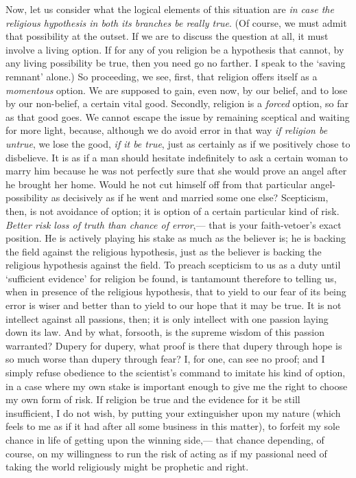 \documentclass[12pt]{article}
\begin{document}
Now, let us consider what the logical elements of this situation are \emph{in case the religious hypothesis in both its branches be really true}. (Of course, we must admit that possibility at the outset.  If we are to discuss the question at all, it must involve a living option.  If for any of you religion be a hypothesis that cannot, by any living possibility be true, then you need go no farther.  I speak to the `saving remnant' alone.)  So proceeding, we see, first, that religion offers itself as a \emph{momentous} option.  We are supposed to gain, even now, by our belief, and to lose by our non-belief, a certain vital good.  Secondly, religion is a \emph{forced} option, so far as that good goes.  We cannot escape the issue by remaining sceptical and waiting for more light, because, although we do avoid error in that way \emph{if religion be untrue}, we lose the good, \emph{if it be true}, just as certainly as if we positively chose to disbelieve.  It is as if a man should hesitate indefinitely to ask a certain woman to marry him because he was not perfectly sure that she would prove an angel after he brought her home.  Would he not cut himself off from that particular angel-possibility as decisively as if he went and married some one else?  Scepticism, then, is not avoidance of option; it is option of a certain particular kind of risk.  \emph{Better risk loss of truth than chance of error},--- that is your faith-vetoer's exact position.  He is actively playing his stake as much as the believer is; he is backing the field against the religious hypothesis, just as the believer is backing the religious hypothesis against the field.  To preach scepticism to us as a duty until  `sufficient evidence' for religion be found, is tantamount therefore to telling us, when in presence of the religious hypothesis, that to yield to our fear of its being error is wiser and better than to yield to our hope that it may be true.  It is not intellect against all passions, then; it is only intellect with one passion laying down its law.  And by what, forsooth, is the supreme wisdom of this passion warranted?  Dupery for dupery, what proof is there that dupery through hope is so much worse than dupery through fear?  I, for one, can see no proof; and I simply refuse obedience to the scientist's command to imitate his kind of option, in a case where my own stake is important enough to give me the right to choose my own form of risk.  If religion be true and the evidence for it be still insufficient, I do not wish, by putting your extinguisher upon my nature (which feels to me as if it had after all some business in this matter), to forfeit my sole chance in life of getting upon the winning side,--- that chance depending, of course, on my willingness to run the risk of acting as if my passional need of taking the world religiously might be prophetic and right.
\end{document}
